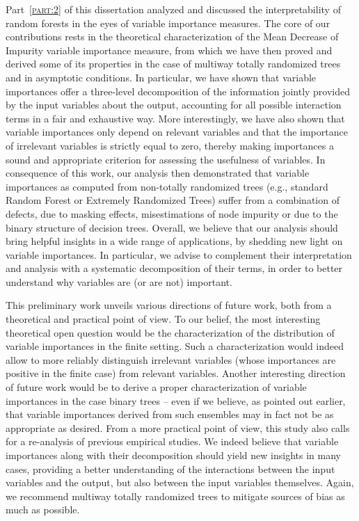 Part~\textsc{\ref{part:2}} of this dissertation analyzed and discussed the
interpretability of random forests in the eyes of variable importance measures.
The core of our contributions rests in the theoretical characterization of the
Mean Decrease of Impurity variable importance measure, from which we have then
proved and derived some of its properties in the case of multiway totally
randomized trees and in asymptotic conditions. In particular, we have shown
that variable importances offer a three-level decomposition of the information
jointly provided by the input variables about the output, accounting for all
possible interaction terms in a fair and exhaustive way. More interestingly, we
have also shown that variable importances only depend on relevant variables and
that the importance of irrelevant variables is strictly equal to zero, thereby
making importances a sound and appropriate criterion for assessing the
usefulness of variables. In consequence of this work, our analysis then
demonstrated that variable importances as computed from non-totally randomized
trees (e.g., standard Random Forest or Extremely Randomized Trees) suffer from
a combination of defects, due to masking effects, misestimations of node
impurity or due to the binary structure of decision trees. Overall, we believe
that our analysis should bring helpful insights in a wide range of
applications, by shedding new light on variable importances. In particular, we
advise to complement their interpretation and analysis with a systematic
decomposition of their terms, in order to better understand why variables are
(or are not) important.

This preliminary work unveils various directions of future work, both from a
theoretical and practical point of view. To our belief, the most interesting
theoretical open question would be the characterization of the distribution of
variable importances in the finite setting. Such a characterization would
indeed allow to more reliably distinguish irrelevant variables (whose
importances are positive in the finite case) from relevant variables. Another
interesting direction of future work would be to derive a proper
characterization of variable importances in the case binary trees -- even if we
believe, as pointed out earlier, that variable importances derived from such
ensembles may in fact not be as appropriate as desired. From a more practical
point of view, this study also calls for a re-analysis of previous empirical
studies. We indeed believe that variable importances along with their
decomposition should yield new insights in many cases, providing a better
understanding of the interactions between the input variables and the output,
but also between the input variables themselves. Again, we recommend multiway
totally randomized trees to mitigate sources of bias as much as possible.

